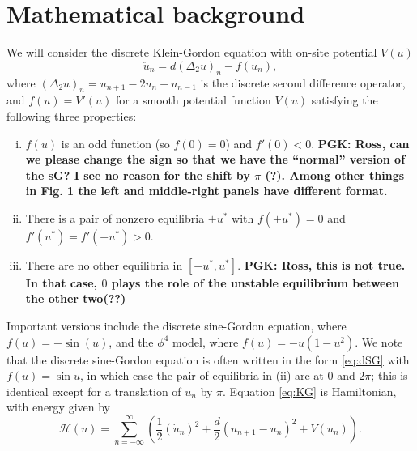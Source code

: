 \documentclass[12pt,reqno]{amsart}
\begin{document}
\section{Mathematical background}\label{sec:bg}

We will consider the discrete Klein-Gordon equation with on-site potential $V(u)$
\begin{equation}\label{eq:KG}
\ddot{u}_n = d (\Delta_2 u)_n - f(u_n),
\end{equation}
where $(\Delta_2 u)_n = u_{n+1} - 2 u_n + u_{n-1}$ is the discrete second difference operator, and $f(u) = V'(u)$ for a smooth potential function $V(u)$ satisfying the following three properties:
\begin{enumerate}[(i)]
	\item $f(u)$ is an odd function (so $f(0) = 0$) and $f'(0) < 0$.
	{\bf PGK: Ross, can we please change the sign so that we have
	the ``normal'' version of the sG? I see no reason for
	the shift by $\pi$ (?). Among other things in Fig. 1 the
	left and middle-right panels have different format.}
	\item There is a pair of nonzero equilibria $\pm u^*$ with $f(\pm u^*) = 0$ and $f'(u^*) = f'(-u^*) > 0$.
	\item There are no other equilibria in $[-u^*, u^*]$.
	{\bf PGK: Ross, this is not true. In that case,
	$0$ plays the role of the unstable equilibrium between
	the other two(??)}
\end{enumerate}
Important versions include the discrete sine-Gordon equation, where $f(u) = -\sin(u)$, and the $\phi^4$ model, where $f(u) = -u(1-u^2)$.
We note that the discrete sine-Gordon equation is often written in the form \cref{eq:dSG} with $f(u) = \sin u$, in which case the pair of equilibria in (ii) are at 0 and $2 \pi$; this is identical except for a translation of $u_n$ by $\pi$. Equation \cref{eq:KG} is Hamiltonian, with energy given by \cite{KevrekidisWeinstein2000}
\begin{equation}
	\mathcal{H}(u) = \sum_{n=-\infty}^\infty 
	\left( \frac{1}{2} (\dot{u}_n)^2 + \frac{d}{2} (u_{n+1} - u_n)^2 + V(u_n) \right).
\end{equation}
\end{document}
